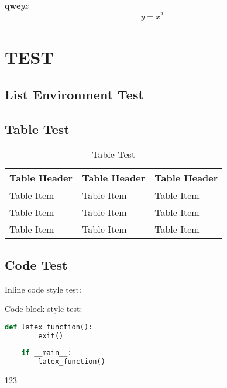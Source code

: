 \documentclass[cn,none,homework]{mdocs}
\begin{document}
\maketitle
{}
$\bm{qwe}yz$
\begin{align}
    y=x^2
\end{align}

\lipsum[1-8]
\section{TEST}
\lipsum[1-8]
\subsection{List Environment Test}
\lipsum[1]
\begin{itemlist}
    \item \lipsum[1]
    \item \lipsum[1]
    \item \lipsum[1]
\end{itemlist}

\lipsum[1]
\begin{numlist}
    \item \lipsum[1]
    \item \lipsum[1]
    \item \lipsum[1]
\end{numlist}
\subsection{Table Test}
\begin{table}[H]
    \centering
    \begin{tabular}{lll}
        \toprule
        Table Header & Table Header & Table Header\\
        \midrule
        Table Item & Table Item & Table Item\\
        Table Item & Table Item & Table Item\\
        Table Item & Table Item & Table Item\\
        \bottomrule
    \end{tabular}
    \caption{Table Test}
\end{table}
\subsection{Code Test}
Inline code style test:


Code block style test:
\begin{lstlisting}[language=Python]
    def latex_function():
        exit()
    
    if __main__:
        latex_function()
\end{lstlisting}
123
\end{document}
